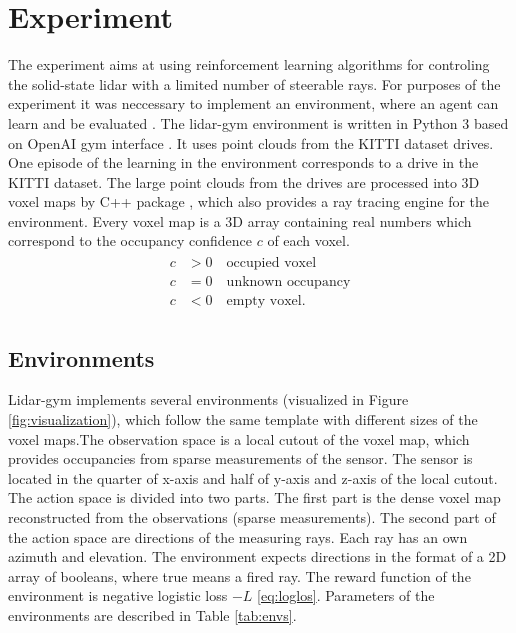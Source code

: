 \section{Experiment}
The experiment aims at using reinforcement learning algorithms for controling the solid-state lidar with a limited number of steerable rays. For purposes of the experiment it was neccessary to implement an environment, where an agent can learn and be evaluated \cite{rozsypalek2018}. The lidar-gym environment is written in Python 3 based on OpenAI gym interface \cite{openai2016}. It uses point clouds from the KITTI dataset drives\cite{geiger2013}. One episode of the learning in the environment corresponds to a drive in the KITTI dataset. The large point clouds from the drives are processed into 3D voxel maps by C++ package \cite{petricek2017}, which also provides a ray tracing engine for the environment. Every voxel map is a 3D array containing real numbers which correspond to the occupancy confidence $c$ of each voxel.
\begin{align}
\begin{split}
c &> 0 \quad \text{occupied voxel} \\
c &= 0 \quad \text{unknown occupancy} \\
c &< 0 \quad \text{empty voxel.}
\end{split}
\end{align}

\subsection{Environments}
Lidar-gym implements several environments (visualized in Figure \ref{fig:visualization}), which follow the same template with different sizes of the voxel maps.The observation space is a local cutout of the voxel map, which provides occupancies from sparse measurements of the sensor. The sensor is located in the quarter of x-axis and half of y-axis and z-axis of the local cutout. The action space is divided into two parts. The first part is the dense voxel map reconstructed from the observations (sparse measurements). The second part of the action space are directions of the measuring rays. Each ray has an own azimuth and elevation. The environment expects directions in the format of a 2D array of booleans, where true means a fired ray. The reward function of the environment is negative logistic loss $-L$ \eqref{eq:loglos}. Parameters of the environments are described in Table \ref{tab:envs}.

